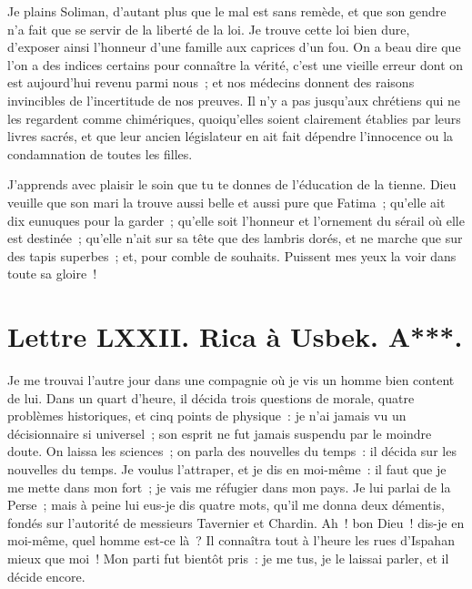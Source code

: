 \documentclass[french,twoside]{book} %
\newcommand{\dateline}[1]{\medskip{\RaggedLeft{#1}\par}\bigskip}
\begin{document}
\noindent Je plains Soliman, d’autant plus que le mal est sans remède, et que son gendre n’a fait que se servir de la liberté de la loi. Je trouve cette loi bien dure, d’exposer ainsi l’honneur d’une famille aux caprices d’un fou. On a beau dire que l’on a des indices certains pour connaître la vérité, c’est une vieille erreur dont on est aujourd’hui revenu parmi nous ; et nos médecins donnent des raisons invincibles de l’incertitude de nos preuves. Il n’y a pas jusqu’aux chrétiens qui ne les regardent comme chimériques, quoiqu’elles soient clairement établies par leurs livres sacrés, et que leur ancien législateur en ait fait dépendre l’innocence ou la condamnation de toutes les filles.\par
J’apprends avec plaisir le soin que tu te donnes de l’éducation de la tienne. Dieu veuille que son mari la trouve aussi belle et aussi pure que Fatima ; qu’elle ait dix eunuques pour la garder ; qu’elle soit l’honneur et l’ornement du sérail où elle est destinée ; qu’elle n’ait sur sa tête que des lambris dorés, et ne marche que sur des tapis superbes ; et, pour comble de souhaits. Puissent mes yeux la voir dans toute sa gloire !\par

\dateline{À Paris, le 5 de la lune de Chalval, 1714.}
\section[{Lettre LXXII. Rica à Usbek. A***.}]{Lettre LXXII. Rica à Usbek. A***.}\renewcommand{\leftmark}{Lettre LXXII. Rica à Usbek. A***.}

\noindent Je me trouvai l’autre jour dans une compagnie où je vis un homme bien content de lui. Dans un quart d’heure, il décida trois questions de morale, quatre problèmes historiques, et cinq points de physique : je n’ai jamais vu un décisionnaire si universel ; son esprit ne fut jamais suspendu par le moindre doute. On laissa les sciences ; on parla des nouvelles du temps : il décida sur les nouvelles du temps. Je voulus l’attraper, et je dis en moi-même : il faut que je me mette dans mon fort ; je vais me réfugier dans mon pays. Je lui parlai de la Perse ; mais à peine lui eus-je dis quatre mots, qu’il me donna deux démentis, fondés sur l’autorité de messieurs Tavernier et Chardin. Ah ! bon Dieu ! dis-je en moi-même, quel homme est-ce là ? Il connaîtra tout à l’heure les rues d’Ispahan mieux que moi ! Mon parti fut bientôt pris : je me tus, je le laissai parler, et il décide encore.\par
\end{document}
